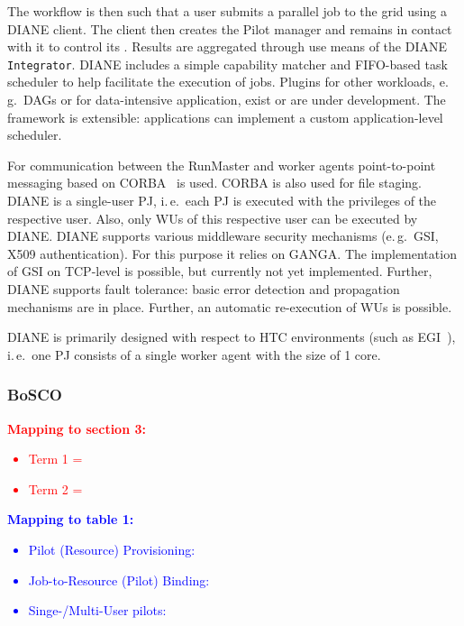 \documentclass{sig-alternate}
\begin{document}

The workflow is then such that a user submits a parallel job to
the grid using a DIANE client.  The client then creates the Pilot manager
and remains in contact with it to control its \pilotjobs.  Results
are aggregated through use means of the DIANE
\texttt{Integrator}.
DIANE includes a simple capability matcher and FIFO-based task scheduler
to help facilitate the execution of jobs.
Plugins for other workloads, e.\,g.\ DAGs or for data-intensive
application, exist or are under development. The framework is extensible:
applications can implement a custom application-level scheduler.

For communication between the RunMaster and
worker agents point-to-point messaging based on CORBA~\cite{OMG-CORBA303:2004}
is used. CORBA is also used for file staging.
DIANE is a single-user PJ, i.\,e.\ each PJ is executed with the
privileges of the respective user. Also, only WUs of this respective user can be
executed by DIANE. DIANE supports various middleware security mechanisms
(e.\,g.\ GSI, X509 authentication). For this purpose it relies on GANGA. The
implementation of GSI on TCP-level is possible, but currently not yet
implemented. Further, DIANE supports fault tolerance: basic error detection and
propagation mechanisms are in place. Further, an automatic re-execution of WUs
is possible.

DIANE is primarily designed with respect to HTC environments (such as
EGI~\cite{egi}), i.\,e.\ one PJ consists of a single worker agent with the
size of 1 core.

%
\subsubsection{BoSCO}

\textcolor{red}
{
\textbf{Mapping to section 3:}
\begin{itemize}
\item Term 1 =
\item Term 2 =
\end{itemize}
}

\textcolor{blue}
{
\textbf{Mapping to table 1:}
\begin{itemize}
\item Pilot (Resource) Provisioning:
\item Job-to-Resource (Pilot) Binding:
\item Singe-/Multi-User pilots:
\end{itemize}
}
\end{document}
